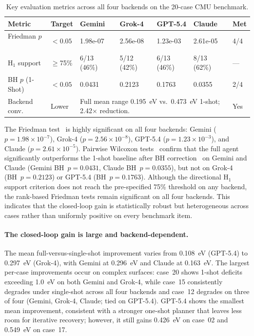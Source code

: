 \begin{table}[t]
\centering
\caption{Key evaluation metrics across all four backends on the 20-case CMU benchmark.}
\label{tab:key-evaluation-metrics}
\begin{tabular}{p{3.3cm}p{1.3cm}p{1.8cm}p{1.8cm}p{1.8cm}p{1.8cm}p{1.0cm}}
\toprule
Metric & Target & Gemini & Grok-4 & GPT-5.4 & Claude & Met \\
\midrule
Friedman $p$~\cite{friedman1937use} & $< 0.05$ & 1.98e-07 & 2.56e-08 & 1.23e-03 & 2.61e-05 & 4/4 \\
H$_1$ support & $\geq$75\% & 6/13 (46\%) & 5/12 (42\%) & 6/13 (46\%) & 8/13 (62\%) & --- \\
BH $p$ (1-Shot)~\cite{benjamini1995controlling} & $< 0.05$ & 0.0431 & 0.2123 & 0.1763 & 0.0355 & 2/4 \\
Backend conv. & Lower & \multicolumn{4}{p{7.2cm}}{Full mean range 0.195~eV vs.\ 0.473~eV 1-shot; 2.42$\times$ reduction.} & Yes \\
\bottomrule
\end{tabular}
\end{table}

The Friedman test~\cite{friedman1937use} is highly significant on all four backends: Gemini ($p = 1.98 \times 10^{-7}$), Grok-4 ($p = 2.56 \times 10^{-8}$), GPT-5.4 ($p = 1.23 \times 10^{-3}$), and Claude ($p = 2.61 \times 10^{-5}$).
Pairwise Wilcoxon tests~\cite{wilcoxon1945individual} confirm that the full agent significantly outperforms the 1-shot baseline after BH correction~\cite{benjamini1995controlling} on Gemini and Claude (Gemini BH~$p = 0.0431$, Claude BH~$p = 0.0355$), but not on Grok-4 (BH~$p = 0.2123$) or GPT-5.4 (BH~$p = 0.1763$).
Although the directional H$_1$ support criterion does not reach the pre-specified 75\% threshold on any backend, the rank-based Friedman tests remain significant on all four backends.
This indicates that the closed-loop gain is statistically robust but heterogeneous across cases rather than uniformly positive on every benchmark item.

\paragraph{The closed-loop gain is large and backend-dependent.}
The mean full-versus-single-shot improvement varies from 0.108~eV (GPT-5.4) to 0.297~eV (Grok-4), with Gemini at 0.296~eV and Claude at 0.163~eV.
The largest per-case improvements occur on complex surfaces: case~20 shows 1-shot deficits exceeding 1.0~eV on both Gemini and Grok-4, while case~15 consistently degrades under single-shot across all four backends and case~12 degrades on three of four (Gemini, Grok-4, Claude; tied on GPT-5.4).
GPT-5.4 shows the smallest mean improvement, consistent with a stronger one-shot planner that leaves less room for iterative recovery; however, it still gains 0.426~eV on case~02 and 0.549~eV on case~17.

